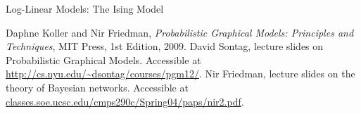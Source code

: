 \documentclass[11pt]{beamer}
\begin{document}
\begin{frame}{Log-Linear Models: The Ising Model}
\begin{center}
\isingmodel
\end{center}
\end{frame}

\begin{thebibliography}{11}
Daphne Koller and Nir Friedman,
\emph{Probabilistic Graphical Models: Principles and Techniques},
MIT Press,
1st Edition,
2009.
David Sontag, lecture slides on Probabilistic Graphical Models.
Accessible at \url{http://cs.nyu.edu/~dsontag/courses/pgm12/}.
Nir Friedman, lecture slides on the theory of Bayesian networks.
Accessible at \url{classes.soe.ucsc.edu/cmps290c/Spring04/paps/nir2.pdf}.
\end{thebibliography}
\end{document}
